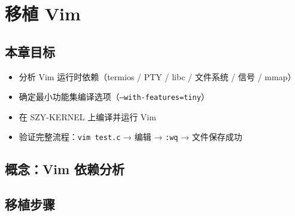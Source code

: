 \chapter{移植 Vim}
\label{ch:port-vim}

\section{本章目标}

\begin{itemize}
  \item 分析 Vim 运行时依赖（termios / PTY / libc / 文件系统 / 信号 / mmap）
  \item 确定最小功能集编译选项（\texttt{--with-features=tiny}）
  \item 在 SZY-KERNEL 上编译并运行 Vim
  \item 验证完整流程：\texttt{vim test.c} → 编辑 → \texttt{:wq} → 文件保存成功
\end{itemize}

\section{概念：Vim 依赖分析}
\label{sec:vim-deps}


\section{移植步骤}
\label{sec:vim-port}

